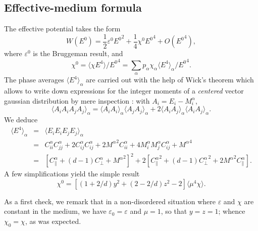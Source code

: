 \subsection{Effective-medium formula}
\label{scf}
The effective potential takes the form
\begin{equation}
W(E^0)=\frac{1}{2}\varepsilon^0 {E^0}^2+\frac{1}{4}\chi^0 {E^0}^4
+O({E^0}^4),
\end{equation}
where $\varepsilon^0$ is the Bruggeman result, and \cite{STRO88,BERG89}
\begin{equation}
\chi^0=\langle \chi E^4\rangle/{E^0}^4=\sum_\alpha p_\alpha \chi_\alpha
\langle E^4\rangle_\alpha/{E^0}^4.
\end{equation}
The phase averages $\langle E^4\rangle_\alpha$ are carried out with the
help of Wick's theorem which allows to write down expressions for the
integer moments of a {\em centered} vector gaussian distribution by
mere inspection \cite{LEBE92}: with $A_i=E_i-M^\alpha_i$,
\begin{equation}
\langle A_iA_iA_jA_j\rangle_\alpha
=\langle A_iA_i\rangle_\alpha\langle A_jA_j\rangle_\alpha
+2\langle A_iA_j\rangle_\alpha\langle A_iA_j\rangle_\alpha.
\end{equation}
We deduce
\begin{eqnarray}
\langle E^4\rangle_\alpha&=&
\langle E_i E_i E_j E_j\rangle_\alpha\nonumber\\
&=&C_{ii}^\alpha C_{jj}^\alpha
+2C_{ij}^\alpha C_{ij}^\alpha+2{M^\alpha}^2C_{ii}^\alpha
+4M^\alpha_iM^\alpha_jC_{ij}^\alpha+{M^\alpha}^4\nonumber\\
&=&\left[C_\parallel^\alpha+(d-1)C_\perp^\alpha +{M^\alpha}^2\right]^2+2\left[{C_\parallel^\alpha}^2 +(d-1){C_\perp^\alpha}^2+2{M^\alpha}^2C_\parallel^\alpha\right].
\end{eqnarray}
A few simplifications yield the simple result
\begin{equation}
\label{csc}
\chi^0=\left[(1+2/d) y^2+(2-2/d)z^2-2\right]\langle \mu^4\chi\rangle.
\end{equation}

As a first check, we remark that in a non-disordered situation
where $\varepsilon$ and $\chi$ are constant in the medium, we
have $\varepsilon_0=\varepsilon$ and $\mu=1$, so that $y=z=1$;
whence $\chi_0=\chi$, as was expected.


